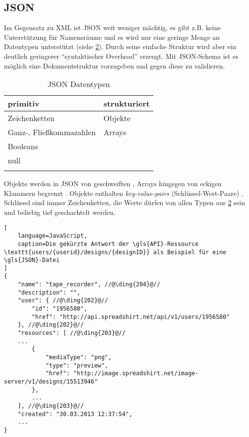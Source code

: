 \subsection{JSON}
\label{sec:json}


Im Gegensatz zu \gls{XML} ist \gls{JSON} weit weniger mächtig, es gibt z.B. keine Unterstützung für Namensräume und es wird nur eine geringe Menge an Datentypen unterstützt (siehe \cref{tab:jsonDatatypes}). 
Durch seine einfache Struktur wird aber ein deutlich geringerer \enquote{syntaktischer Overhead} erzeugt.
Mit \gls{JSON}-Schema \cite{json-schema-draft} ist es möglich eine Dokumentstruktur vorzugeben und gegen diese zu validieren. 

\begin{table}[tb]
    \begin{longtable}[c]{l l}
        \toprule
        \rowcolor{lightgray}
        \textbf{primitiv}   & \textbf{strukturiert}\\
        \midrule
        Zeichenketten       & Objekte\\
        Ganz-, 
        Fließkommazahlen    & Arrays\\
        Booleans            & \\
        null                & \\
        \bottomrule
        \caption{\gls{JSON} Datentypen}
        \label{tab:jsonDatatypes}
    \end{longtable}
\end{table}

Objekte werden in \gls{JSON} von geschweiften , Arrays hingegen von eckigen Klammern begrenzt . 
Objekte enthalten \emph{key-value-pairs} (Schlüssel-Wert-Paare) . Schlüssel sind immer Zeichenketten, die Werte dürfen von allen Typen aus \cref{tab:jsonDatatypes} sein und beliebig tief geschachtelt werden.
%
%
\begin{minipage}{\textwidth}
\begin{lstlisting}[
    language=JavaScript,
    caption=Die gekürzte Antwort der \gls{API}-Ressource \texttt{users/{userid}/designs/{designID}} als Beispiel für eine \gls{JSON}-Datei
]
{
    "name": "tape_recorder", //@\ding{204}@//
    "description": "",
    "user": { //@\ding{202}@//
        "id": "1956580",
        "href": "http://api.spreadshirt.net/api/v1/users/1956580"
    }, //@\ding{202}@//
    "resources": [ //@\ding{203}@//
    ...
        {
            "mediaType": "png",
            "type": "preview",
            "href": "http://image.spreadshirt.net/image-server/v1/designs/15513946"
        }, 
        ...
    ], //@\ding{203}@//
    "created": "30.03.2013 12:37:54",
    ...
}
\end{lstlisting}    
\end{minipage}
